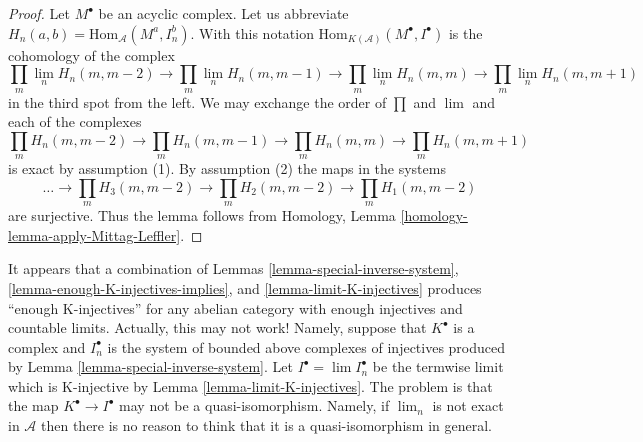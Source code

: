 \begin{proof}
Let $M^\bullet$ be an acyclic complex. Let us abbreviate
$H_n(a, b) = \text{Hom}_\mathcal{A}(M^a, I_n^b)$. With this notation
$\text{Hom}_{K(\mathcal{A})}(M^\bullet, I^\bullet)$ is the cohomology
of the complex
$$
\prod_m \lim\limits_n H_n(m, m - 2)
\to
\prod_m \lim\limits_n H_n(m, m - 1)
\to
\prod_m \lim\limits_n H_n(m, m)
\to
\prod_m \lim\limits_n H_n(m, m + 1)
$$
in the third spot from the left.
We may exchange the order of $\prod$ and $\lim$ and each of the complexes
$$
\prod_m H_n(m, m - 2)
\to
\prod_m H_n(m, m - 1)
\to
\prod_m H_n(m, m)
\to
\prod_m H_n(m, m + 1)
$$
is exact by assumption (1). By assumption (2) the maps in the systems
$$
\ldots \to
\prod_m H_3(m, m - 2) \to
\prod_m H_2(m, m - 2) \to
\prod_m H_1(m, m - 2)
$$
are surjective. Thus the lemma follows from
Homology, Lemma \ref{homology-lemma-apply-Mittag-Leffler}.
\end{proof}

\begin{remark}
\label{remark-difficulty-K-injectives}
It appears that a combination of
Lemmas \ref{lemma-special-inverse-system},
\ref{lemma-enough-K-injectives-implies}, and
\ref{lemma-limit-K-injectives}
produces ``enough K-injectives'' for any abelian category with enough
injectives and countable limits. Actually, this may not work!
Namely, suppose that $K^\bullet$ is a complex and $I_n^\bullet$ is the
system of bounded above complexes of injectives produced by
Lemma \ref{lemma-special-inverse-system}.
Let $I^\bullet = \lim I_n^\bullet$ be the termwise limit which is
K-injective by
Lemma \ref{lemma-limit-K-injectives}.
The problem is that the map $K^\bullet \to I^\bullet$ may not be a
quasi-isomorphism. Namely, if $\lim_n$ is not exact in $\mathcal{A}$
then there is no reason to think that it is a quasi-isomorphism in general.
\end{remark}
















